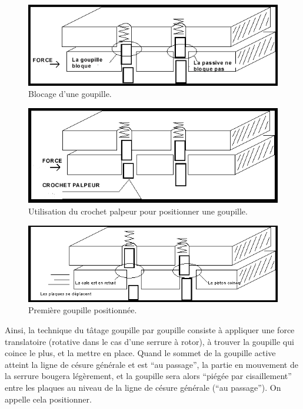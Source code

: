 \documentclass[a4paper,french,11pt,twoside]{report}
\begin{document}
\begin{figure}[h]
  \begin{center}
    \includegraphics[width=16cm]{images/Image6}
    \caption{Blocage d'une goupille.\label{blocage_goupille}}
  \end{center}
\end{figure}

\begin{figure}[h]
  \begin{center}
    \includegraphics[width=16cm]{images/Image7}
    \caption{Utilisation du crochet palpeur pour positionner une goupille.\label{crochet_goupille}}
  \end{center}
\end{figure}

\begin{figure}[h]
  \begin{center}
    \includegraphics[width=16cm]{images/Image8}
    \caption{Première goupille positionnée.\label{goupille_positionnee}}
  \end{center}
\end{figure}


Ainsi, la technique du tâtage goupille par goupille consiste à appliquer une force translatoire (rotative dans le cas d'une serrure à rotor), à trouver la goupille qui coince le plus, et la mettre en place. Quand le sommet de la goupille active atteint la ligne de césure générale et est \enquote{au passage}, la partie en mouvement de la serrure bougera légèrement, et la goupille sera alors \enquote{piégée par cisaillement} entre les plaques au niveau de la ligne de césure générale (\enquote{au passage}). On appelle cela positionner.
\end{document}
